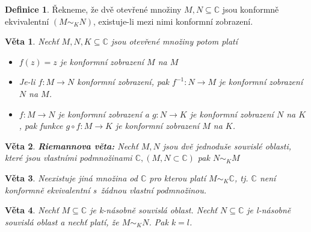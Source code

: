 \documentclass[a4]{report}
\newcommand{\CC}{\mathbb{C}}
\newtheorem{theorem}{Věta}
\theoremstyle{definition}
\newtheorem{definition}{Definice}[section]
\begin{document}
\begin{definition}
	Řekneme, že dvě otevřené množiny $M,N \subseteq \CC$ jsou konformně ekvivalentní $(M\sim_K N)$, existuje-li mezi nimi konformní zobrazení.
\end{definition}

\begin{theorem}
	Nechť $M,N, K \subseteq \CC$ jsou otevřené množiny potom platí
	\begin{itemize}
		\item $f(z)=z$ je konformní zobrazení $M$ na $M$
		\item Je-li $f:M\rightarrow N$ konformní zobrazení, pak $f^{-1}: N\rightarrow M$ je konformní zobrazení $N$ na $M$.
		\item $f:M\rightarrow N$ je konformní zobrazení a $g:N\rightarrow K$ je konformní zobrazení $N$ na $K$, pak funkce $g \circ f:M\rightarrow K$ je konformní zobrazení $M$ na $K$.
	\end{itemize}
\end{theorem}

\begin{theorem}
	\textbf{Riemannova věta:} Nechť $M,N$ jsou dvě jednoduše souvislé oblasti, které jsou vlastními podmnožinami $\CC, (M,N \subset \CC) $ pak $N\sim_K M$
\end{theorem}

\begin{theorem}
	Neexistuje jiná množina od $\CC$ pro kterou platí $M\sim_K \CC$, tj. $\CC $ není konformně ekvivalentní s~žádnou vlastní podmnožinou.
\end{theorem}

\begin{theorem}
	Nechť $M\subseteq \CC$ je k-násobně souvislá oblast. Nechť $N \subseteq \CC $ je l-násobně souvislá oblast a nechť platí, že $M\sim_K N$. Pak $k=l$.
\end{theorem}



\end{document}

